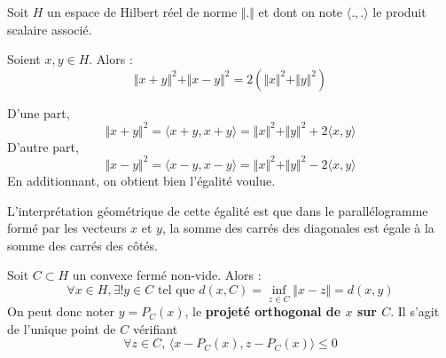 



	
	Soit $H$ un espace de Hilbert réel de norme $\Vert . \Vert$ et dont on note $\langle ., . \rangle$ le produit scalaire associé.
	
	\begin{lemma}
		\label{projection-sur-un-convexe-ferme-1}
		Soient $x, y \in H$. Alors :
		\[ \Vert x + y \Vert^2 + \Vert x - y \Vert^2 = 2(\Vert x \Vert^2 + \Vert y \Vert^2) \]
	\end{lemma}

	\begin{demonstration}
		D'une part,
		\[ \Vert x + y \Vert^2 = \langle x + y, x + y \rangle = \Vert x \Vert^2 + \Vert y \Vert^2 + 2 \langle x, y \rangle \]
		D'autre part,
		\[ \Vert x - y \Vert^2 = \langle x - y, x - y \rangle = \Vert x \Vert^2 + \Vert y \Vert^2 - 2 \langle x, y \rangle \]
		En additionnant, on obtient bien l'égalité voulue.
	\end{demonstration}

	\begin{remark}
		L'interprétation géométrique de cette égalité est que dans le parallélogramme formé par les vecteurs $x$ et $y$, la somme des carrés des diagonales est égale à la somme des carrés des côtés.
	\end{remark}
	
	
	\begin{theorem}
		\label{projection-sur-un-convexe-ferme-2}
		Soit $C \subset H$ un convexe fermé non-vide. Alors :
		\[ \forall x \in H, \exists! y \in C \text{ tel que } d(x, C) = \inf_{z \in C} \Vert x - z \Vert = d(x, y) \]
		On peut donc noter $y = P_C(x)$, le \textbf{projeté orthogonal de $x$ sur $C$}. Il s'agit de l'unique point de $C$ vérifiant
		\[ \forall z \in C, \, \langle x - P_C(x), z - P_C(x) \rangle \leq 0 \tag{$*$} \]
	\end{theorem}


